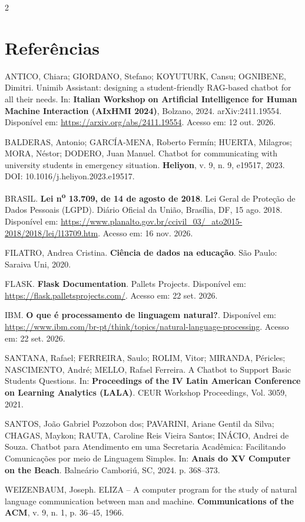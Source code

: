 \documentclass[10pt]{article}
\begin{document}
\begin{multicols}{2}
\section{Referências}

ANTICO, Chiara; GIORDANO, Stefano; KOYUTURK, Cansu; OGNIBENE, Dimitri.
Unimib Assistant: designing a student-friendly RAG-based chatbot for all
their needs. In: \textbf{Italian Workshop on Artificial Intelligence for
Human Machine Interaction (AIxHMI 2024)}, Bolzano, 2024. arXiv:2411.19554.
Disponível em: \url{https://arxiv.org/abs/2411.19554}. Acesso em: 12 out.
2026.

BALDERAS, Antonio; GARCÍA-MENA, Roberto Fermín; HUERTA, Milagros; MORA,
Néstor; DODERO, Juan Manuel. Chatbot for communicating with university
students in emergency situation. \textbf{Heliyon}, v. 9, n. 9, e19517,
2023. DOI: 10.1016/j.heliyon.2023.e19517.

BRASIL. \textbf{Lei n\textsuperscript{o} 13.709, de 14 de agosto de 2018}. Lei Geral de Proteção de Dados Pessoais (LGPD). Diário Oficial da União, Brasília, DF, 15 ago. 2018. Disponível em: \url{https://www.planalto.gov.br/ccivil_03/_ato2015-2018/2018/lei/l13709.htm}. Acesso em: 16 nov. 2026.

FILATRO, Andrea Cristina. \textbf{Ciência de dados na educação}. São
Paulo: Saraiva Uni, 2020.

FLASK. \textbf{Flask Documentation}. Pallets Projects. Disponível em:
\url{https://flask.palletsprojects.com/}. Acesso em: 22 set. 2026.

IBM. \textbf{O que é processamento de linguagem natural?}. Disponível em:
\url{https://www.ibm.com/br-pt/think/topics/natural-language-processing}.
Acesso em: 22 set. 2026.

SANTANA, Rafael; FERREIRA, Saulo; ROLIM, Vitor; MIRANDA, Péricles;
NASCIMENTO, André; MELLO, Rafael Ferreira. A Chatbot to Support Basic
Students Questions. In: \textbf{Proceedings of the IV Latin American
Conference on Learning Analytics (LALA)}. CEUR Workshop Proceedings, Vol.
3059, 2021.

SANTOS, João Gabriel Pozzobon dos; PAVARINI, Ariane Gentil da Silva;
CHAGAS, Maykon; RAUTA, Caroline Reis Vieira Santos; INÁCIO, Andrei de
Souza. Chatbot para Atendimento em uma Secretaria Acadêmica: Facilitando
Comunicações por meio de Linguagem Simples. In: \textbf{Anais do XV
Computer on the Beach}. Balneário Camboriú, SC, 2024. p. 368--373.

WEIZENBAUM, Joseph. ELIZA -- A computer program for the study of natural
language communication between man and machine. \textbf{Communications of
the ACM}, v. 9, n. 1, p. 36--45, 1966.

\end{multicols}
\end{document}
